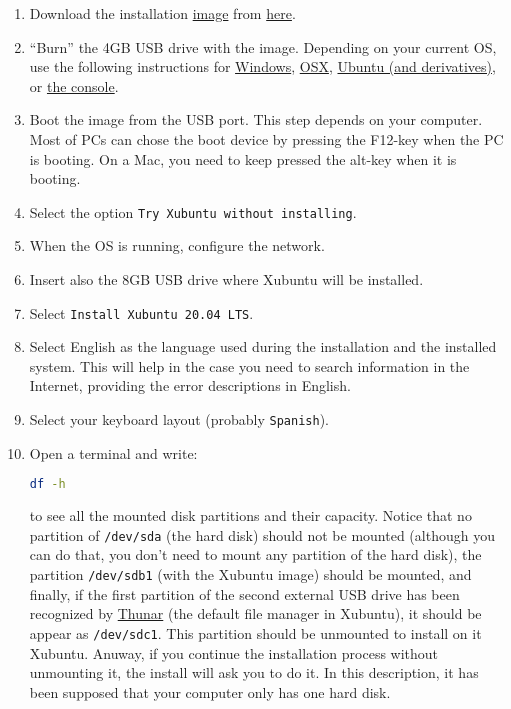 \begin{enumerate}
  \item Download the
    installation \href{https://en.wikipedia.org/wiki/Disk_image}{image}
    from \href{https://xubuntu.org/download/}{here}.
    
  \item ``Burn'' the 4GB USB drive with the image. Depending on your
    current OS, use the following instructions
    for \href{https://ubuntu.com/tutorials/create-a-usb-stick-on-windows#1-overview}{Windows}, \href{https://ubuntu.com/tutorials/create-a-usb-stick-on-macos#1-overview}{OSX}, \href{https://ubuntu.com/tutorials/create-a-usb-stick-on-ubuntu#1-overview}{Ubuntu
    (and derivatives)},
    or \href{https://askubuntu.com/questions/372607/how-to-create-a-bootable-ubuntu-usb-flash-drive-from-terminal}{the
    console}.

\item Boot the image from the USB port. This step depends on your
  computer. Most of PCs can chose the boot device by pressing the
  F12-key when the PC is booting. On a Mac, you need to keep pressed
  the alt-key when it is booting.
  
\item Select the option \texttt{Try Xubuntu without installing}.
  
\item When the OS is running, configure the network.
  
\item Insert also the 8GB USB drive where Xubuntu will be installed.
  
\item Select \texttt{Install Xubuntu 20.04 LTS}.
  
\item Select English as the language used during the installation and the
  installed system. This will help in the case you need to search
  information in the Internet, providing the error descriptions in
  English.
  
\item Select your keyboard layout (probably \texttt{Spanish}).

\item Open a terminal and write:

  \begin{lstlisting}[language=bash]
    df -h
  \end{lstlisting}

  to see all the mounted disk partitions and their capacity. Notice
  that no partition of \texttt{/dev/sda} (the hard disk) should not be
  mounted (although you can do that, you don't need to mount any
  partition of the hard disk), the partition \texttt{/dev/sdb1} (with
  the Xubuntu image) should be mounted, and finally, if the first
  partition of the second external USB drive has been recognized by
  \href{https://gitlab.xfce.org/xfce/thunar}{Thunar} (the default file
  manager in Xubuntu), it should be appear as \texttt{/dev/sdc1}. This
  partition should be unmounted to install on it Xubuntu. Anuway, if
  you continue the installation process without unmounting it, the
  install will ask you to do it. In this description, it has been
  supposed that your computer only has one hard disk.


\end{enumerate}
